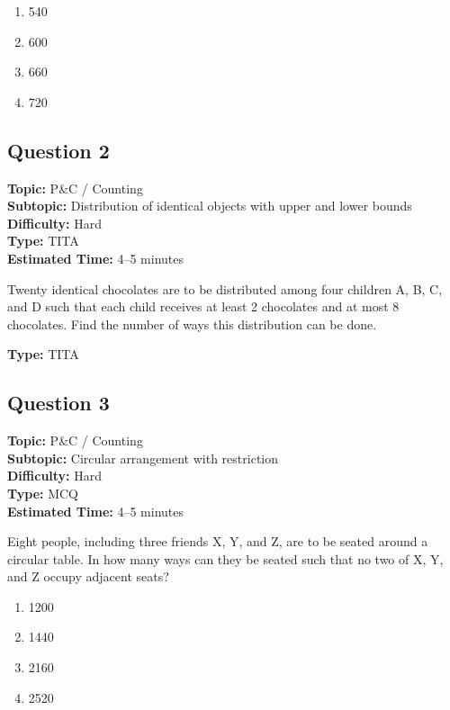 \documentclass[11pt]{article}
\begin{document}
\begin{enumerate}[label=(\Alph*)]
\item 540
\item 600
\item 660
\item 720
\end{enumerate}

\subsection*{Question 2}
\textbf{Topic:} P\&C / Counting \\
\textbf{Subtopic:} Distribution of identical objects with upper and lower bounds \\
\textbf{Difficulty:} Hard \\
\textbf{Type:} TITA \\
\textbf{Estimated Time:} 4--5 minutes

\begin{tcolorbox}
Twenty identical chocolates are to be distributed among four children A, B, C, and D such that each child receives at least 2 chocolates and at most 8 chocolates. Find the number of ways this distribution can be done.
\end{tcolorbox}

\textbf{Type:} TITA

\subsection*{Question 3}
\textbf{Topic:} P\&C / Counting \\
\textbf{Subtopic:} Circular arrangement with restriction \\
\textbf{Difficulty:} Hard \\
\textbf{Type:} MCQ \\
\textbf{Estimated Time:} 4--5 minutes

\begin{tcolorbox}
Eight people, including three friends X, Y, and Z, are to be seated around a circular table. In how many ways can they be seated such that no two of X, Y, and Z occupy adjacent seats?
\end{tcolorbox}

\begin{enumerate}[label=(\Alph*)]
\item 1200
\item 1440
\item 2160
\item 2520
\end{enumerate}
\end{document}
